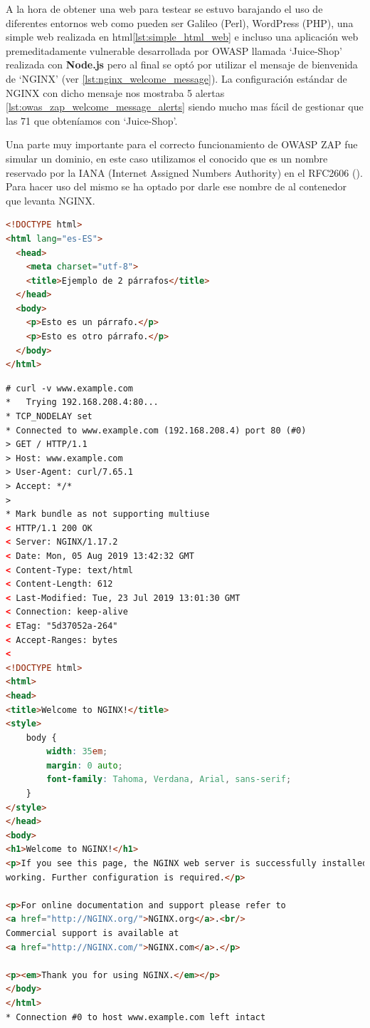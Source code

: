 \bigskip
A la hora de obtener una web para testear se estuvo barajando el uso de diferentes entornos web como pueden ser Galileo (Perl), WordPress (PHP), una simple web realizada en html\ref{lst:simple_html_web} e incluso una aplicación web premeditadamente vulnerable desarrollada por OWASP llamada `Juice-Shop' realizada con \textbf{Node.js} pero al final se optó por utilizar el mensaje de bienvenida de `NGINX' (ver \ref{lst:nginx_welcome_message}). La configuración estándar de NGINX con dicho mensaje nos mostraba 5 alertas \ref{lst:owas_zap_welcome_message_alerts} siendo mucho mas fácil de gestionar que las 71 que obteníamos con `Juice-Shop'.

\bigskip
Una parte muy importante para el correcto funcionamiento de OWASP ZAP fue simular un dominio, en este caso utilizamos el conocido  que es un nombre reservado por la IANA (Internet Assigned Numbers Authority) en el RFC2606 (\cite{eastlake_reserved_1999}). Para hacer uso del mismo se ha optado por darle ese nombre de  al contenedor que levanta NGINX.


\begin{lstlisting}[language=html, label={lst:simple_html_web},caption={Web sencilla realizada en HTML puro}]
<!DOCTYPE html>
<html lang="es-ES">
  <head>
    <meta charset="utf-8">
    <title>Ejemplo de 2 párrafos</title>
  </head>
  <body>
    <p>Esto es un párrafo.</p>
    <p>Esto es otro párrafo.</p>
  </body>
</html>
\end{lstlisting}

\begin{lstlisting}[language=html, label={lst:nginx_welcome_message},caption={Mensaje de bienvenida de NGINX}]
# curl -v www.example.com
*   Trying 192.168.208.4:80...
* TCP_NODELAY set
* Connected to www.example.com (192.168.208.4) port 80 (#0)
> GET / HTTP/1.1
> Host: www.example.com
> User-Agent: curl/7.65.1
> Accept: */*
>
* Mark bundle as not supporting multiuse
< HTTP/1.1 200 OK
< Server: NGINX/1.17.2
< Date: Mon, 05 Aug 2019 13:42:32 GMT
< Content-Type: text/html
< Content-Length: 612
< Last-Modified: Tue, 23 Jul 2019 13:01:30 GMT
< Connection: keep-alive
< ETag: "5d37052a-264"
< Accept-Ranges: bytes
<
<!DOCTYPE html>
<html>
<head>
<title>Welcome to NGINX!</title>
<style>
    body {
        width: 35em;
        margin: 0 auto;
        font-family: Tahoma, Verdana, Arial, sans-serif;
    }
</style>
</head>
<body>
<h1>Welcome to NGINX!</h1>
<p>If you see this page, the NGINX web server is successfully installed and
working. Further configuration is required.</p>

<p>For online documentation and support please refer to
<a href="http://NGINX.org/">NGINX.org</a>.<br/>
Commercial support is available at
<a href="http://NGINX.com/">NGINX.com</a>.</p>

<p><em>Thank you for using NGINX.</em></p>
</body>
</html>
* Connection #0 to host www.example.com left intact
\end{lstlisting}

